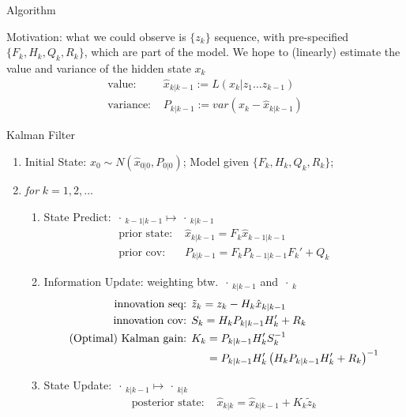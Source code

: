 \begin{point}
    Algorithm
\end{point}

Motivation: what we could observe is $ \{z_k\} $ sequence, with pre-specified $ \{F_k,H_k,Q_k,R_k\} $, which are part of the model. We hope to (linearly) estimate the value and variance of the hidden state $ x_k $
\begin{align}
    \text{value: }&\hat{x}_{k|k-1}:=L(x_k|z_1\ldots z_{k-1})\\
    \text{variance: }&P_{k|k-1}:=var\left(x_k-\hat{x}_{k|k-1}\right)
\end{align}

\begin{algorithm}{Kalman Filter}
    \begin{enumerate}[topsep=2pt,itemsep=2pt]
        \item Initial State: $ x_0\sim N(\hat{x}_{0|0}, P _{0|0})  $; Model given $ \{F_k,H_k,Q_k,R_k\} $;
        \item \textit{for} $ k=1,2,\ldots $
        \begin{enumerate}[topsep=2pt,itemsep=2pt]
            \item State Predict: $ \, \cdot \, _{k-1|k-1}\mapsto \, \cdot \, _{k|k-1} $
            \begin{align}
                \text{prior state: }&\hat{x}_{k|k-1}=F_k \hat{x}_{k-1|k-1}\\
                \text{prior cov: }&P_{k|k-1}=F_kP_{k-1|k-1}F_k'+Q_k
            \end{align}
            \item Information Update: weighting btw. $ \, \cdot \, _{k|k-1} $ and $ \, \cdot \, _{k} $
            \begin{align}
                \text{innovation seq: }&\tilde{z}_k=z_k-H_k\hat{x}_{k|k-1}\\
                \text{innovation cov: }&S_k=H_kP_{k|k-1}H_k'+R_k\\
                \text{(Optimal) Kalman gain: }&K_k=P_{k|k-1}H_k'S_k^{-1}\\
                &{\color{white}K_k}=P_{k|k-1}H_k'\left(H_kP_{k|k-1}H_k'+R_k\right)^{-1}
            \end{align}
            \item State Update: $ \, \cdot \, _{k|k-1}\mapsto \, \cdot \, _{k|k} $
            \begin{align}\label{EqaKalmanPosteriorUpdate}
                \text{posterior state: }&\hat{x}_{k|k}=\hat{x}_{k|k-1}+K_k\tilde{z}_k\\

\end{align}
\end{enumerate}
\end{enumerate}
\end{algorithm}
